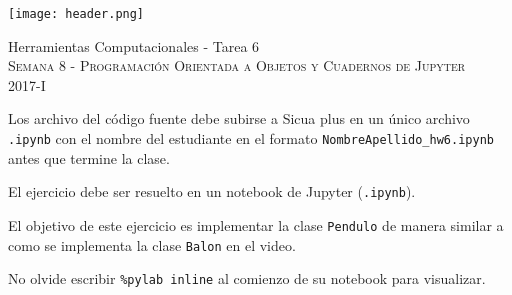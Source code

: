 \documentclass[11pt,letterpaper]{exam}
\begin{document}
\begin{center}

\texttt{[image: header.png]}

\vspace{1.0cm}
{\Large Herramientas Computacionales - Tarea 6} \\
\textsc{Semana 8 - Programaci\'on Orientada a Objetos y Cuadernos de Jupyter}\\
2017-I\\
\end{center}



\vspace{0.5cm}

\noindent
Los archivo del c\'odigo fuente debe subirse a Sicua plus en un \'unico archivo
\verb".ipynb" con el nombre del estudiante en el formato \verb"NombreApellido_hw6.ipynb" antes que termine la clase.

El ejercicio debe ser resuelto en un notebook de Jupyter (\verb'.ipynb').
	
El objetivo de este ejercicio es implementar la clase \verb'Pendulo' de manera similar a como se implementa la clase \verb'Balon' en el video.

No olvide escribir \verb'%pylab inline' al comienzo de su notebook para visualizar.

\vspace{0.5cm}
\end{document}
